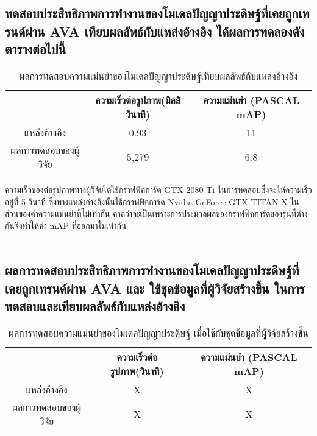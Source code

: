 \subsection{ทดสอบประสิทธิภาพการทำงานของโมเดลปัญญาประดิษฐ์ที่เคยถูกเทรนด์ผ่าน AVA เทียบผลลัพธ์กับแหล่งอ้างอิง ได้ผลการทดลองดังตารางต่อไปนี้}
\begin{table}[!ht]
	\centering
	\begin{tabular}{|c|c|c|}
			\hline
			{}&{ความเร็วต่อรูปภาพ(มิลลิวินาที)}&{ความแม่นยำ (PASCAL mAP)}			\\
			\hline
			แหล่งอ้างอิง	 					& 0.93		& 11														\\
			ผลการทดสอบของผู้วิจัย				& 5,279  		& 6.8				\\
			\hline
	\end{tabular}
\caption{ผลการทดสอบความแม่นยำของโมเดลปัญญาประดิษฐ์เทียบผลลัพธ์กับแหล่งอ้างอิง}
\label{tab: Compare PASCAL mAP with source}
\end{table}
ความเร็วของต่อรูปภาพทางผู้วิจัยได้ใช้กราฟฟิคการ์ด GTX 2080 Ti ในการทดสอบซึ่งจะให้ความเร็วอยู่ที่ 5 วินาที ซึ่งทางแหล่งอ้างอิงนั้นใช้กราฟฟิคการ์ด Nvidia GeForce GTX TITAN X ในส่วนของค่าความแม่นยำที่ไม่เท่ากัน คาดว่าจะเป็นเพราะการประมวลผลของกราฟฟิคการ์ดของรุ่นที่ต่างกันจึงทำให้ค่า mAP ที่ออกมาไม่เท่ากัน
\\\\
\subsection{ผลการทดสอบประสิทธิภาพการทำงานของโมเดลปัญญาประดิษฐ์ที่เคยถูกเทรนด์ผ่าน AVA และ ใช้ชุดข้อมูลที่ผู้วิจัยสร้างขึ้น ในการทดสอบและเทียบผลลัพธ์กับแหล่งอ้างอิง}
\begin{table}[!ht]
	\centering
	\begin{tabular}{|c|c|c|}
			\hline
			{}&{ความเร็วต่อรูปภาพ(วินาที)}&{ความแม่นยำ (PASCAL mAP)}			\\
			\hline
			แหล่งอ้างอิง	 					& X			& X														\\
			ผลการทดสอบของผู้วิจัย				& X			& X				\\
			\hline
	\end{tabular}
\caption{ผลการทดสอบความแม่นยำของโมเดลปัญญาประดิษฐ์ เมื่อใช้กับชุดข้อมูลที่ผู้วิจัยสร้างขึ้น}
\label{tab: Compare PASCAL mAP with dataset created by the researcher}
\end{table}
